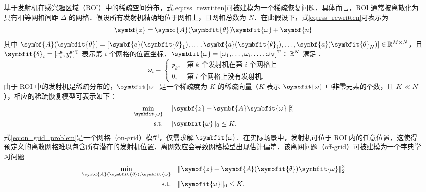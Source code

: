 \documentclass[a4paper,zihao=-4]{ctexart}
\renewcommand{\mathbf}[1]{\symbf{#1}}
\renewcommand{\boldsymbol}[1]{\symbfit{#1}}
\begin{document}
基于发射机在感兴趣区域（ROI）中的稀疏空间分布，式\eqref{eq:rss_rewritten}可被建模为一个稀疏恢复问题．具体而言，ROI 通常被离散化为具有相等网格间距 $\Delta$ 的网格．假设所有发射机精确地位于网格上，且网格总数为 $N$．在此假设下，式\eqref{eq:rss_rewritten}可表示为
\begin{equation}
	\label{eq:sparse_grid_model}
	\mathbf{z} = \mathbf{A}(\boldsymbol{\theta}) \boldsymbol{\omega} + \mathbf{n}
\end{equation}
其中 $\mathbf{A}(\boldsymbol{\theta}) = [\mathbf{a}(\boldsymbol{\theta}_1), \dots, \mathbf{a}(\boldsymbol{\theta}_i), \dots, \mathbf{a}(\boldsymbol{\theta}_N)] \in \mathbb{R}^{M \times N}$，且 $\boldsymbol{\theta}_i = [x_i^\mathrm{g}, y_i^\mathrm{g}]^\mathrm{T}$ 表示第 $i$ 个网格的位置坐标．$\boldsymbol{\omega} = [\omega_1, \dots, \omega_i, \dots, \omega_N]^\mathrm{T} \in \mathbb{R}^N$ 满足：
\begin{equation}
	\label{eq:sparse_vector_def}
	\omega_i =
	\begin{cases}
		p_k, & \text{第 } k \text{ 个发射机在第 } i \text{ 个网格上} \\
		0,   & \text{第 } i \text{ 个网格上没有发射机}.
	\end{cases}
\end{equation}
由于 ROI 中的发射机是稀疏分布的，$\boldsymbol{\omega}$ 是一个稀疏度为 $K$ 的稀疏向量（$K$ 表示 $\boldsymbol{\omega}$ 中非零元素的个数，且 $K \ll N$），相应的稀疏恢复模型可表示如下：
\begin{equation}
	\label{eq:on_grid_problem}
	\begin{aligned}
		\min_{\boldsymbol{\omega}} \quad & \| \mathbf{z} - \mathbf{A} \boldsymbol{\omega} \|_2^2 \\
		\text{s.t.} \quad                & \| \boldsymbol{\omega} \|_0 \leq K.
	\end{aligned}
\end{equation}
式\eqref{eq:on_grid_problem}是一个网格（on-grid）模型，仅需求解 $\boldsymbol{\omega}$．在实际场景中，发射机可位于 ROI 内的任意位置，这使得预定义的离散网格难以包含所有潜在的发射机位置．离网效应会导致网格模型出现估计偏差．该离网问题（off-grid）可被建模为一个字典学习问题
\begin{equation}
	\label{eq:off_grid_problem}
	\begin{aligned}
		\min_{\mathbf{A}(\boldsymbol{\theta}), \boldsymbol{\omega}} \quad & \| \mathbf{z} - \mathbf{A}(\boldsymbol{\theta}) \boldsymbol{\omega} \|_2^2 \\
		\text{s.t.} \quad                                                 & \| \boldsymbol{\omega} \|_0 \leq K.
	\end{aligned}
\end{equation}
\end{document}
